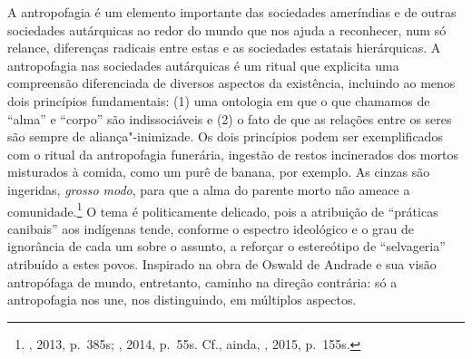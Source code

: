 A antropofagia é um elemento importante das sociedades ameríndias e de
outras sociedades autárquicas ao redor do mundo que nos ajuda a
reconhecer, num só relance, diferenças radicais entre estas e as
sociedades estatais hierárquicas. A antropofagia nas sociedades
autárquicas é um ritual que explicita uma compreensão diferenciada de
diversos aspectos da existência, incluindo ao menos dois princípios
fundamentais: (1) uma ontologia em que o que chamamos de ``alma'' e
``corpo'' são indissociáveis e (2) o fato de que as relações entre os
seres são sempre de aliança"-inimizade. Os dois princípios podem ser
exemplificados com o ritual da antropofagia funerária, ingestão de
restos incinerados dos mortos misturados à comida, como um purê de
banana, por exemplo. As cinzas são ingeridas, \emph{grosso modo}, para
que a alma do parente morto não ameace a comunidade.\footnote{,
  2013, p.~385s; , 2014, p.~55s. Cf., ainda, ,
  2015, p.~155s.} O tema é politicamente delicado, pois a atribuição de
``práticas canibais'' aos indígenas tende, conforme o espectro
ideológico e o grau de ignorância de cada um sobre o assunto, a reforçar
o estereótipo de ``selvageria'' atribuído a estes povos. Inspirado na
obra de Oswald de Andrade e sua visão antropófaga de mundo, entretanto,
caminho na direção contrária: só a antropofagia nos une, nos
distinguindo, em múltiplos aspectos.

